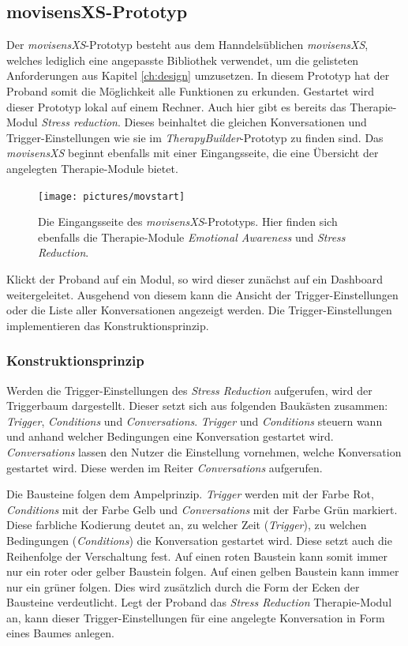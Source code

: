 \subsection{movisensXS-Prototyp}
Der \emph{movisensXS}-Prototyp besteht aus dem Hanndelsüblichen \emph{movisensXS}, welches lediglich eine angepasste Bibliothek verwendet, um die gelisteten Anforderungen aus Kapitel \ref{ch:design} umzusetzen. In diesem Prototyp hat der Proband somit die Möglichkeit alle Funktionen zu erkunden. Gestartet wird dieser Prototyp lokal auf einem Rechner. Auch hier gibt es bereits das Therapie-Modul \emph{Stress reduction}. Dieses beinhaltet die gleichen Konversationen und Trigger-Einstellungen wie sie im \emph{TherapyBuilder}-Prototyp zu finden sind. Das \emph{movisensXS} beginnt ebenfalls mit einer Eingangsseite, die eine Übersicht der angelegten Therapie-Module bietet. 

\begin{figure}[h]
\centering
\texttt{[image: pictures/movstart]}
\caption{Die Eingangsseite des \emph{movisensXS}-Prototyps. Hier finden sich ebenfalls die Therapie-Module \emph{Emotional Awareness} und \emph{Stress Reduction}.}
\label{start}
\end{figure}

Klickt der Proband auf ein Modul, so wird dieser zunächst auf ein Dashboard weitergeleitet. Ausgehend von diesem kann die Ansicht der Trigger-Einstellungen oder die Liste aller Konversationen angezeigt werden. Die Trigger-Einstellungen implementieren das Konstruktionsprinzip.

\subsubsection{Konstruktionsprinzip}
Werden die Trigger-Einstellungen des \emph{Stress Reduction} aufgerufen, wird der Triggerbaum dargestellt. Dieser setzt sich aus folgenden Baukästen zusammen: \emph{Trigger}, \emph{Conditions} und \emph{Conversations}. \emph{Trigger} und \emph{Conditions} steuern wann und anhand welcher Bedingungen eine Konversation gestartet wird.  \emph{Conversations} lassen den Nutzer die Einstellung vornehmen, welche Konversation gestartet wird. Diese werden im Reiter \emph{Conversations} aufgerufen. 

Die Bausteine folgen dem Ampelprinzip. \emph{Trigger} werden mit der Farbe Rot, \emph{Conditions} mit der Farbe Gelb und \emph{Conversations} mit der Farbe Grün markiert. Diese farbliche Kodierung deutet an, zu welcher Zeit (\emph{Trigger}), zu welchen Bedingungen (\emph{Conditions}) die Konversation gestartet wird. Diese setzt auch die Reihenfolge der Verschaltung fest. Auf einen roten Baustein kann somit immer nur ein roter oder gelber Baustein folgen. Auf einen gelben Baustein kann immer nur ein grüner folgen. Dies wird zusätzlich durch die Form der Ecken der Bausteine verdeutlicht. Legt der Proband das \emph{Stress Reduction} Therapie-Modul an, kann dieser Trigger-Einstellungen für eine angelegte Konversation in Form eines Baumes anlegen.  

